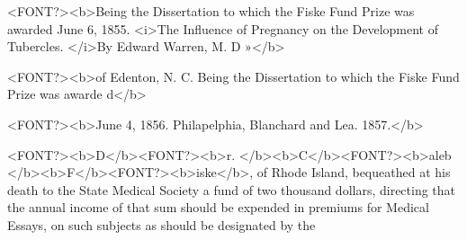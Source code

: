 <FONT?><b>Being the Dissertation to which the Fiske Fund Prize was awarded June 6, 1855.
<i>The Influence of Pregnancy on the Development of Tubercles.   </i>By Edward Warren, M. D »</b>

<FONT?><b>of Edenton, N. C.   Being the Dissertation to which the Fiske Fund Prize was awarde d</b>

<FONT?><b>June 4, 1856.   Philapelphia, Blanchard and Lea. 1857.</b>

<FONT?><b>D</b><FONT?><b>r. </b><b>C</b><FONT?><b>aleb </b><b>F</b><FONT?><b>iske</b>, of Rhode Island, bequeathed at his death to the
State Medical Society a fund of two thousand dollars, directing that
the annual income of that sum should be expended in premiums for
Medical Essays, on such subjects as should be designated by the\endinput
